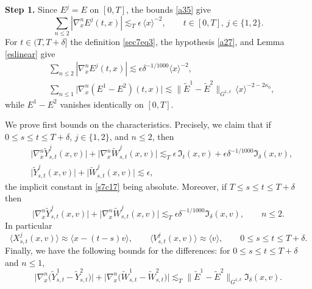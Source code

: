 \documentclass[reqno,11pt]{amsart}
\numberwithin{equation}{section}
\begin{document}
	\textbf{Step 1.} Since $E^j=E$ on $[0,T]$, the bounds \eqref{a35} give
	\begin{equation}\label{s7c13}
		\sum_{n\leq2}|\nabla_x^nE^j(t,x)|\lesssim_T\epsilon\,\langle x\rangle^{-2},
		\qquad t\in[0,T],\,j\in\{1,2\}.
	\end{equation}
	For $t\in(T,T+\delta]$ the definition \eqref{sec7eq3}, the hypothesis \eqref{a27}, and Lemma
	\ref{eslinear} give
	\begin{equation}\label{s7c14}
	\begin{split}
		&\sum_{n\leq2}|\nabla_x^nE^j(t,x)|\lesssim \epsilon\delta^{-1/1000}\langle x\rangle^{-2},\\
		&\sum_{n\leq1}\bigl|\nabla_x^n(E^1-E^2)(t,x)\bigr|\lesssim \|\tilde{E}^1-\tilde{E}^2\|_{G^{1,\delta}}\,\langle x\rangle^{-2-2\kappa_0},
		\end{split}
	\end{equation}
	while $E^1-E^2$ vanishes identically on $[0,T]$. 
	
	We prove first bounds on the characteristics. Precisely, we claim that if $0\leq s\leq t\leq T+\delta$, $j\in\{1,2\}$, and $n\leq2$, then
	\begin{align}
		&\bigl|\nabla_x^n\widetilde Y^j_{s,t}(x,v)\bigr|+\bigl|\nabla_x^n\widetilde W^j_{s,t}(x,v)\bigr|
		\lesssim_T\epsilon\,\mathfrak I_t(x,v)+\epsilon\delta^{-1/1000}\mathfrak I_\delta(x,v),
		\label{s7c16}\\
		&\bigl|\widetilde Y^j_{s,t}(x,v)\bigr|+\bigl|\widetilde W^j_{s,t}(x,v)\bigr|\lesssim\epsilon,
		\label{s7c17}
	\end{align}
	the implicit constant in \eqref{s7c17} being absolute. Moreover, if $T\leq s\leq t\leq T+\delta$ then
	\begin{equation}\label{s7c18}
		\bigl|\nabla_x^n\widetilde Y^j_{s,t}(x,v)\bigr|+\bigl|\nabla_x^n\widetilde W^j_{s,t}(x,v)\bigr|
		\lesssim_T\epsilon\delta^{-1/1000}\mathfrak I_\delta(x,v),\qquad n\leq2 .
	\end{equation}
	In particular
	\begin{equation*}
		\bigl\langle X^j_{s,t}(x,v)\bigr\rangle\approx\langle x-(t-s)v\rangle,
		\qquad
		\bigl\langle V^j_{s,t}(x,v)\bigr\rangle\approx\langle v\rangle,
		\qquad 0\leq s\leq t\leq T+\delta .
	\end{equation*}
	Finally, we have the following bounds for the differences: for $0\leq s\leq t\leq T+\delta$ and $n\leq1$,
	\begin{equation}\label{s7c21}
		\bigl|\nabla_x^n\bigl(\widetilde Y^1_{s,t}-\widetilde Y^2_{s,t}\bigr)\bigr|
		+\bigl|\nabla_x^n\bigl(\widetilde W^1_{s,t}-\widetilde W^2_{s,t}\bigr)\bigr|
		\lesssim_T\|\tilde{E}^1-\tilde{E}^2\|_{G^{1,\delta}}\mathfrak I_\delta(x,v) .
	\end{equation}
\end{document}
